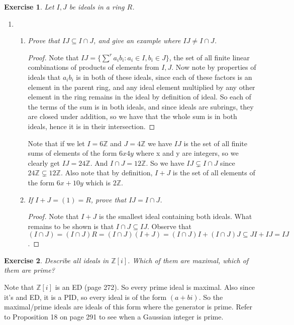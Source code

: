 \documentclass[10pt,oneside,reqno]{amsart}
\theoremstyle{plain}
\newtheorem{e}{Exercise}
\theoremstyle{definition}
\newcommand{\sub}{\subseteq}
\newcommand{\z}{\mathbb{Z}}
\begin{document}
\begin{e}
Let $I,J$ be ideals in a ring $R$. 
\end{e}

\begin{enumerate}
\item[]
\begin{enumerate}
\item \textit{Prove that $IJ \sub I \cap J$, and give an example where $IJ \neq I \cap J$. }

\begin{proof}
Note that $IJ = \{\sum^r a_ib_i: a_i \in I,b_i \in J\}$, the set of all finite linear combinations of products of elements from $I,J$. Now note by properties of ideals that $a_ib_i$ is in both of these ideals, since each of these factors is an element in the parent ring, and any ideal element multiplied by any other element in the ring remains in the ideal by definition of ideal. So each of the terms of the sum is in both ideals, and since ideals are subrings, they are closed under addition, so we have that the whole sum is in both ideals, hence it is in their intersection. 
\end{proof}
Note that if we let $I = 6\z$ and $J = 4\z$ we have $IJ$ is the set of all finite sums of elements of the form $6x4y$ where x and y are integers, so we clearly get $IJ = 24\z$. And $I \cap J = 12\z$. So we have $IJ \subsetneq I \cap J$ since $24\z \subsetneq 12\z$. Also note that by definition, $I + J$ is the set of all elements of the form $6x + 10y$ which is $2\z$. 
\item \textit{If $I + J = (1) = R$, prove that $IJ = I \cap J$. }
\begin{proof}
Note that $I + J$ is the smallest ideal containing both ideals. What remains to be shown is that $I \cap J \sub IJ$. Observe that $(I \cap J) = (I \cap J)R = (I \cap J)(I + J) = (I \cap J)I + (I \cap J)J \sub JI + IJ = IJ$. 
\end{proof}
\end{enumerate}
\end{enumerate}

\begin{e}
Describe all ideals in $\z[i]$. Which of them are maximal, which of them are prime?
\end{e}
Note that $\z[i]$ is an ED (page 272). So every prime ideal is maximal. Also since it's and ED, it is a PID, so every ideal is of the form $(a + bi)$. So the maximal/prime ideals are ideals of this form where the generator is prime. Refer to Proposition 18 on page 291 to see when a Gaussian integer is prime. 
\end{document}
